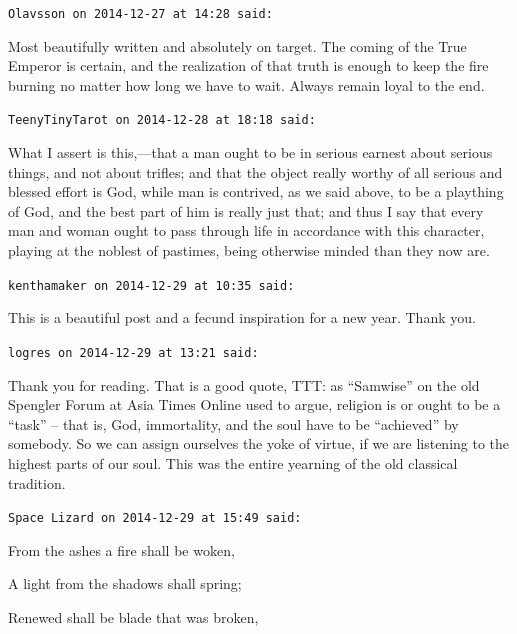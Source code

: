 \begin{footnotesize}
\begin{sffamily}
\texttt{Olavsson on 2014-12-27 at 14:28 said:}

Most beautifully written and absolutely on target. The coming of the True Emperor is certain, and the realization of that truth is enough to keep the fire burning no matter how long we have to wait. Always remain loyal to the end.

\hfill

\texttt{TeenyTinyTarot on 2014-12-28 at 18:18 said:}

\begin{quotex}\footnotesize
What I assert is this,---that a man ought to be in serious earnest about serious things, and not about trifles; and that the object really worthy of all serious and blessed effort is God, while man is contrived, as we said above, to be a plaything of God, and the best part of him is really just that; and thus I say that every man and woman ought to pass through life in accordance with this character, playing at the noblest of pastimes, being otherwise minded than they now are.
\end{quotex}

\hfill

\texttt{kenthamaker on 2014-12-29 at 10:35 said:}

This is a beautiful post and a fecund inspiration for a new year. Thank you.

\hfill

\texttt{logres on 2014-12-29 at 13:21 said:}

Thank you for reading. That is a good quote, TTT: as ``Samwise'' on the old Spengler Forum at Asia Times Online used to argue, religion is or ought to be a ``task'' -- that is, God, immortality, and the soul have to be ``achieved'' by somebody. So we can assign ourselves the yoke of virtue, if we are listening to the highest parts of our soul. This was the entire yearning of the old classical tradition.

\hfill

\texttt{Space Lizard on 2014-12-29 at 15:49 said:}

From the ashes a fire shall be woken,

A light from the shadows shall spring;

Renewed shall be blade that was broken,


\end{sffamily}
\end{footnotesize}
